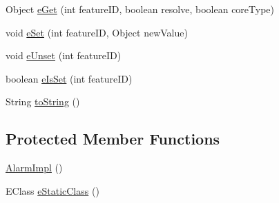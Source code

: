 \begin{DoxyCompactItemize}
\item 
Object \hyperlink{classshootingmachineemfmodel_1_1impl_1_1_alarm_impl_ade1331328d4f6a82a2874e9941420796}{e\-Get} (int feature\-I\-D, boolean resolve, boolean core\-Type)
\item 
void \hyperlink{classshootingmachineemfmodel_1_1impl_1_1_alarm_impl_ac987bb4dbdac6c9d643b70a8a5a673ea}{e\-Set} (int feature\-I\-D, Object new\-Value)
\item 
void \hyperlink{classshootingmachineemfmodel_1_1impl_1_1_alarm_impl_aa27f814c8e6b33d38b386843c7d2c37f}{e\-Unset} (int feature\-I\-D)
\item 
boolean \hyperlink{classshootingmachineemfmodel_1_1impl_1_1_alarm_impl_a3dc038d95cdf700101d4e42dfb0f0b33}{e\-Is\-Set} (int feature\-I\-D)
\item 
String \hyperlink{classshootingmachineemfmodel_1_1impl_1_1_alarm_impl_afd2fa4fce4e047cb1c2f0b1fa6567aa7}{to\-String} ()
\end{DoxyCompactItemize}
\subsection*{Protected Member Functions}
\begin{DoxyCompactItemize}
\item 
\hyperlink{classshootingmachineemfmodel_1_1impl_1_1_alarm_impl_a143a60a89a29b13380beabe5e11d7eea}{Alarm\-Impl} ()
\item 
E\-Class \hyperlink{classshootingmachineemfmodel_1_1impl_1_1_alarm_impl_a4923e39f23595d75a7fe98486d376c45}{e\-Static\-Class} ()
\end{DoxyCompactItemize}
